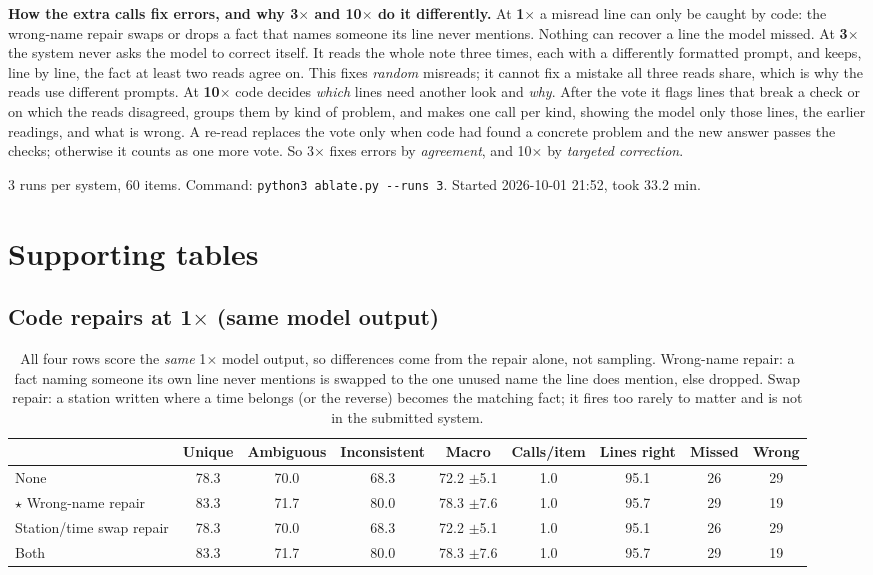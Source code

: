 \documentclass[10pt]{article}
\begin{document}
\textbf{How the extra calls fix errors, and why 3$\times$ and 10$\times$ do it differently.}
At \textbf{1$\times$} a misread line can only be caught by code: the wrong-name repair swaps or drops a fact that names someone its line never mentions. Nothing can recover a line the model missed.
At \textbf{3$\times$} the system never asks the model to correct itself. It reads the whole note three times, each with a differently formatted prompt, and keeps, line by line, the fact at least two reads agree on. This fixes \emph{random} misreads; it cannot fix a mistake all three reads share, which is why the reads use different prompts.
At \textbf{10$\times$} code decides \emph{which} lines need another look and \emph{why}. After the vote it flags lines that break a check or on which the reads disagreed, groups them by kind of problem, and makes one call per kind, showing the model only those lines, the earlier readings, and what is wrong. A re-read replaces the vote only when code had found a concrete problem and the new answer passes the checks; otherwise it counts as one more vote. So 3$\times$ fixes errors by \emph{agreement}, and 10$\times$ by \emph{targeted correction}.

{\footnotesize 3 runs per system, 60 items. Command: \texttt{python3 ablate.py -{}-runs 3}. Started 2026-10-01 21:52, took 33.2 min.}

\clearpage
\section*{Supporting tables}
\subsection*{Code repairs at 1$\times$ (same model output)}
\begin{table}[H]
\centering\footnotesize\setlength{\tabcolsep}{3.5pt}\renewcommand{\arraystretch}{1.08}
\begin{tabular}{@{}p{5.4cm} ccc c c ccc@{}}
\toprule
 & Unique & Ambiguous & Inconsistent & \textbf{Macro} & Calls/item & Lines right & Missed & Wrong \\
\midrule
None & 78.3 & 70.0 & 68.3 & 72.2 {\scriptsize$\pm$5.1} & 1.0 & 95.1 & 26 & 29 \\
$\star$ Wrong-name repair & 83.3 & 71.7 & 80.0 & 78.3 {\scriptsize$\pm$7.6} & 1.0 & 95.7 & 29 & 19 \\
Station/time swap repair & 78.3 & 70.0 & 68.3 & 72.2 {\scriptsize$\pm$5.1} & 1.0 & 95.1 & 26 & 29 \\
Both & 83.3 & 71.7 & 80.0 & 78.3 {\scriptsize$\pm$7.6} & 1.0 & 95.7 & 29 & 19 \\
\bottomrule
\end{tabular}
\caption{All four rows score the \emph{same} 1$\times$ model output, so differences come from the repair alone, not sampling. Wrong-name repair: a fact naming someone its own line never mentions is swapped to the one unused name the line does mention, else dropped. Swap repair: a station written where a time belongs (or the reverse) becomes the matching fact; it fires too rarely to matter and is not in the submitted system.}
\end{table}
\end{document}
